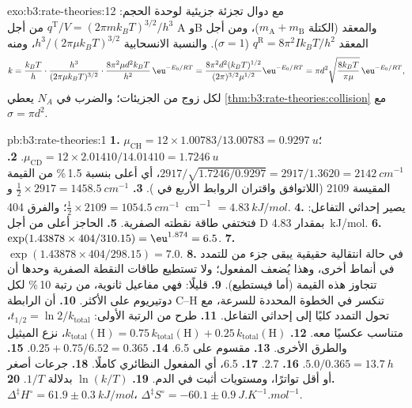 \begin{solution}{exo:b3:rate-theories:12}
مع دوال تجزئة جزيئية لوحدة الحجم: $q^{\mathrm T}/V = (2\pi mk_BT)^{3/2}/h^3$ من أجل
A وB والمعقد (الكتلة $m_{\mathrm A} + m_{\mathrm B}$)، ومن أجل المعقد $q^{\mathrm R} = 8\pi^2Ik_BT/h^2$
($\sigma = 1$). والنسبة الانسحابية $h^3/(2\pi\mu k_BT)^{3/2}$، ومنه
\[
  k = \frac{k_BT}{h}\cdot\frac{h^3}{(2\pi\mu k_BT)^{3/2}}\cdot\frac{8\pi^2\mu d^2k_BT}{h^2}\,\eu^{-E_0/RT}
    = \frac{8\pi^2d^2(k_BT)^{1/2}}{(2\pi)^{3/2}\mu^{1/2}}\eu^{-E_0/RT}
    = \pi d^2\sqrt{\frac{8k_BT}{\pi\mu}}\,\eu^{-E_0/RT},
\]
لكل زوج من الجزيئات؛ والضرب في $N_A$ يعطي \cref{thm:b3:rate-theories:collision}
مع $\sigma = \pi d^2$.
\end{solution}

\begin{solution}{pb:b3:rate-theories:1}
\textbf{1.} $\mu_{\mathrm{CH}} = 12 \times 1.00783/13.00783 = \qty{0.9297}{u}$؛ $\mu_{\mathrm{CD}} = 12 \times 2.01410/14.01410 =
\qty{1.7246}{u}$.
\textbf{2.} $2917/\sqrt{1.7246/0.9297} = 2917/1.3620 = \qty{2142}{cm^{-1}}$، أي أعلى بنسبة 1.5\,\% من
القيمة المقيسة 2109 (اللاتوافق واقتران الروابط الأربع في ).
\textbf{3.} $\frac12 \times 2917 = \qty{1458.5}{cm^{-1}}$ و$\frac12 \times 2109 = \qty{1054.5}{cm^{-1}}$؛ والفرق
\qty{404}{cm^{-1}} $= \qty{4.83}{kJ/mol}$.
\textbf{4.} يصير إحداثي التفاعل: فتختفي طاقة نقطته الصفرية.
\textbf{5.} الحاجز أعلى من أجل D بمقدار \qty{4.83}{kJ/mol}.
\textbf{6.} $\exp(1.43878 \times 404/310.15) = \eu^{1.874} = 6.5$.
\textbf{7.} $\exp(1.43878 \times 404/298.15) = 7.0$.
\textbf{8.} في حالة انتقالية حقيقية يبقى جزء من  للتمدد
في أنماط أخرى، وهذا يُضعف المفعول؛ ولا تستطيع طاقات النقطة الصفرية وحدها
أن تتجاوز هذه القيمة (أما  فيستطيع).
\textbf{9.} قليلًا: فهي مفاعيل ثانوية، من رتبة 10\,\% لكل دوتيريوم على
الأكثر.
\textbf{10.} أن الرابطة C--H تنكسر في الخطوة المحددة للسرعة، مع
تحول التمدد كليًا إلى إحداثي التفاعل.
\textbf{11.} طرح من الرتبة الأولى: $t_{1/2} = \ln2/k_{\mathrm{total}}$، متناسب عكسيًا معه.
\textbf{12.} $k_{\mathrm{total}}(\mathrm H) = 0.75\,k_{\mathrm{total}}(\mathrm H) + 0.25\,k_{\mathrm{total}}(\mathrm H)$، نزع الميثيل والطرق الأخرى.
\textbf{13.} مقسوم على 6.5.
\textbf{14.} $0.25 + 0.75/6.52 = 0.365$.
\textbf{15.} $5.0/0.365 = \qty{13.7}{h}$.
\textbf{16.} 2.7.
\textbf{17.} 6.5، أي المفعول النظائري كاملًا.
\textbf{18.} جرعات أصغر أو أقل تواترًا، ومستويات أثبت في الدم.
\textbf{19.} $\ln(k/T)$ بدلالة $1/T$.
\textbf{20.} $\Delta^{\ddagger}H^\circ = 61.9 \pm \qty{0.3}{kJ/mol}$، $\Delta^{\ddagger}S^\circ = -60.1 \pm \qty{0.9}{J.K^{-1}.mol^{-1}}$.

\end{solution}
